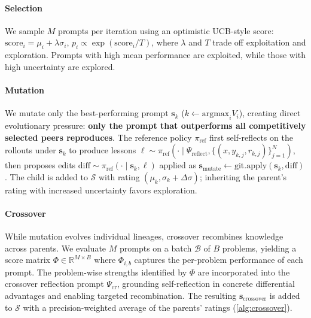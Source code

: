\documentclass{article}
\theoremstyle{plain}
\theoremstyle{definition}
\theoremstyle{remark}
\begin{document}
\vspace{-5pt}
\paragraph{Selection} We sample $M$ prompts per iteration using an optimistic UCB-style score: $\mathrm{score}_{i} = \mu_{i}+\lambda \sigma_{i}$, $p_{i} \propto \exp ( \mathrm{score}_{i} /T )$\label{eq:selection-equation}, where $\lambda$ and $T$ trade off exploitation and exploration. Prompts with high mean performance are exploited, while those with high uncertainty are explored.

\vspace{-5pt}
\paragraph{Mutation} We mutate only the best-performing prompt $\mathbf{s}_k$ ($k \leftarrow \mathrm{argmax}_{i} V_{i}$), creating direct evolutionary pressure: \textbf{only the prompt that outperforms all competitively selected peers reproduces}. The reference policy $\pi_{\text{ref}}$ first self-reflects on the rollouts under $\mathbf{s}_k$ to produce lessons $\ell \sim \pi_{\text{ref}}(\cdot \mid \Psi_{\text{reflect}}, \{(x, y_{k,j}, r_{k,j})\}_{j=1}^{N})$, then proposes edits $\mathrm{diff} \sim \pi_{\text{ref}}(\cdot \mid \mathbf{s}_{k}, \ell)$ applied as $\mathbf{s}_{\text{mutate}} \leftarrow \mathrm{git}.\mathrm{apply}(\mathbf{s}_{k}, \mathrm{diff})$. The child is added to $\mathcal{S}$ with rating $(\mu_{k}, \sigma_{k}+\Delta \sigma)$; inheriting the parent's rating with increased uncertainty favors exploration.


\vspace{-5pt}
\paragraph{Crossover} While mutation evolves individual lineages, crossover recombines knowledge across parents. We evaluate $M$ prompts on a batch $\mathcal{B}$ of $B$ problems, yielding a score matrix $\Phi \in \mathbb{R}^{M\times B}$ where $\Phi_{i,b}$ captures the per-problem performance of each prompt. The problem-wise strengths identified by $\Phi$ are incorporated into the crossover reflection prompt $\Psi_{\mathrm{cr}}$, grounding self-reflection in concrete differential advantages and enabling targeted recombination. The resulting $\mathbf{s}_{\text{crossover}}$ is added to $\mathcal{S}$ with a precision-weighted average of the parents’ ratings (\cref{alg:crossover}).
\end{document}
